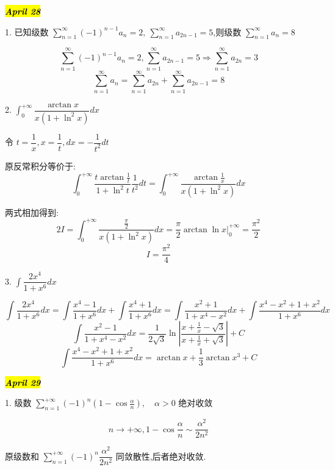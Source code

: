 
\hl{\textbf{\textit{April 28}}}

1. 已知级数 $\sum\limits_{n=1}^{\infty}(-1)^{n-1}a_{n}=2,\ \sum\limits_{n=1}^{\infty}a_{2n-1}=5$,则级数 $\sum\limits_{n=1}^{\infty}a_{n}=8$

\begin{solution}
	
	$$\sum\limits_{n=1}^{\infty}(-1)^{n-1}a_{n}=2,\sum\limits_{n=1}^{\infty}a_{2n-1}=5\Rightarrow \sum\limits_{n=1}^{\infty}a_{2n}=3$$
	$$\sum\limits_{n=1}^{\infty}a_{n}=\sum\limits_{n=1}^{\infty}a_{2n}+\sum\limits_{n=1}^{\infty}a_{2n-1}=8$$
\end{solution}


2. $\int_{0}^{+\infty}\dfrac{\arctan x}{x(1+\ln^2 x)}dx$
\begin{solution}
	
	令 $t=\dfrac{1}{x},x=\dfrac{1}{t},dx=-\dfrac{1}{t^2}dt$
	
	原反常积分等价于: 
	$$\int_{0}^{+\infty}\frac{t\arctan \frac{1}{t}}{1+\ln^2 t}\frac{1}{t^2}dt=\int_{0}^{+\infty}\frac{\arctan \frac{1}{x}}{x(1+\ln^2 x)}dx$$
	
	两式相加得到: 
	$$2I=\int_{0}^{+\infty}\frac{\frac{\pi}{2}}{x(1+\ln^2 x)}dx=\frac{\pi}{2}\arctan \ln x|_{0}^{+\infty}=\frac{\pi^2}{2}$$
	$$I=\frac{\pi^2}{4}$$
\end{solution}


3. $\int\dfrac{2x^4}{1+x^6}dx$
\begin{solution}
	
	$$\int\frac{2x^4}{1+x^6}dx=\int\frac{x^4-1}{1+x^6}dx+\int\frac{x^4+1}{1+x^6}dx=\int\frac{x^2+1}{1+x^4-x^2}dx+\int\frac{x^4-x^2+1+x^2}{1+x^6}dx$$
	$$\int\frac{x^2-1}{1+x^4-x^2}dx=\frac{1}{2\sqrt{3}}\ln|\frac{x+\frac{1}{x}-\sqrt{3}}{x+\frac{1}{x}+\sqrt{3}}|+C$$
	$$\int\frac{x^4-x^2+1+x^2}{1+x^6}dx=\arctan x+\frac{1}{3}\arctan x^3+C$$
\end{solution}


\hl{\textbf{\textit{April 29}}}

1. 级数 $\sum\limits_{n=1}^{+\infty}(-1)^n(1-\cos \frac{\alpha}{n}),\quad \alpha >0$ 绝对收敛

\begin{solution}
	
	$$n\rightarrow +\infty,1-\cos \frac{\alpha}{n}\sim \frac{\alpha^2}{2n^2}$$
	
	原级数和 $\sum\limits_{n=1}^{+\infty}(-1)^n\dfrac{\alpha^2}{2n^2}$ 同敛散性,后者绝对收敛.
\end{solution}

